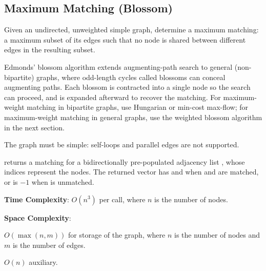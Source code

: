 \subsection{Maximum Matching (Blossom)}
\label{sec:4.6.5}
Given an undirected, unweighted simple graph, determine a maximum matching: a maximum subset of its edges such that no node is shared between different edges in the resulting subset.

Edmonds' blossom algorithm extends augmenting-path search to general (non-bipartite) graphs, where odd-length cycles called blossoms can conceal augmenting paths. Each blossom is contracted into a single node so the search can proceed, and is expanded afterward to recover the matching. For maximum-weight matching in bipartite graphs, use Hungarian or min-cost max-flow; for maximum-weight matching in general graphs, use the weighted blossom algorithm in the next section.

The graph must be simple: self-loops and parallel edges are not supported.

\begin{compactitem}
  \item {} returns a matching for a bidirectionally pre-populated adjacency list , whose indices represent the nodes. The returned vector  has  and  when  and  are matched, or  is $-1$ when  is unmatched.
\end{compactitem}

\textbf{Time Complexity}: $O(n^{3})$ per call, where $n$ is the number of nodes.

\textbf{Space Complexity}:
\begin{compactitem}
  \item $O(\max\left(n, m\right))$ for storage of the graph, where $n$ is the number of nodes and $m$ is the number of edges.
  \item $O(n)$ auxiliary.
\end{compactitem}

